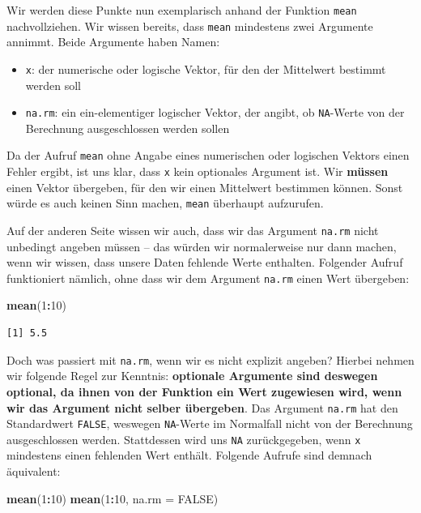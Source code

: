 \documentclass[12pt,]{tufte-book}
\newenvironment{Shaded}{\begin{snugshade}}{\end{snugshade}}
\newcommand{\KeywordTok}[1]{\textcolor[rgb]{0.13,0.29,0.53}{\textbf{#1}}}
\newcommand{\DataTypeTok}[1]{\textcolor[rgb]{0.13,0.29,0.53}{#1}}
\newcommand{\DecValTok}[1]{\textcolor[rgb]{0.00,0.00,0.81}{#1}}
\newcommand{\OtherTok}[1]{\textcolor[rgb]{0.56,0.35,0.01}{#1}}
\newcommand{\OperatorTok}[1]{\textcolor[rgb]{0.81,0.36,0.00}{\textbf{#1}}}
\newcommand{\NormalTok}[1]{#1}
\providecommand{\tightlist}{%
  \setlength{\itemsep}{0pt}\setlength{\parskip}{0pt}}
\theoremstyle{definition}
\theoremstyle{definition}
\theoremstyle{definition}
\theoremstyle{remark}
\begin{document}
Wir werden diese Punkte nun exemplarisch anhand der Funktion
\texttt{mean} nachvollziehen. Wir wissen bereits, dass \texttt{mean}
mindestens zwei Argumente annimmt. Beide Argumente haben Namen:

\begin{itemize}
\tightlist
\item
  \texttt{x}: der numerische oder logische Vektor, für den der
  Mittelwert bestimmt werden soll
\item
  \texttt{na.rm}: ein ein-elementiger logischer Vektor, der angibt, ob
  \texttt{NA}-Werte von der Berechnung ausgeschlossen werden sollen
\end{itemize}

Da der Aufruf \texttt{mean} ohne Angabe eines numerischen oder logischen
Vektors einen Fehler ergibt, ist uns klar, dass \texttt{x} kein
optionales Argument ist. Wir \textbf{müssen} einen Vektor übergeben, für
den wir einen Mittelwert bestimmen können. Sonst würde es auch keinen
Sinn machen, \texttt{mean} überhaupt aufzurufen.

Auf der anderen Seite wissen wir auch, dass wir das Argument
\texttt{na.rm} nicht unbedingt angeben müssen -- das würden wir
normalerweise nur dann machen, wenn wir wissen, dass unsere Daten
fehlende Werte enthalten. Folgender Aufruf funktioniert nämlich, ohne
dass wir dem Argument \texttt{na.rm} einen Wert übergeben:

\begin{Shaded}
\begin{Highlighting}[]
\KeywordTok{mean}\NormalTok{(}\DecValTok{1}\OperatorTok{:}\DecValTok{10}\NormalTok{)}
\end{Highlighting}
\end{Shaded}

\begin{verbatim}
[1] 5.5
\end{verbatim}

Doch was passiert mit \texttt{na.rm}, wenn wir es nicht explizit
angeben? Hierbei nehmen wir folgende Regel zur Kenntnis:
\textbf{optionale Argumente sind deswegen optional, da ihnen von der
Funktion ein Wert zugewiesen wird, wenn wir das Argument nicht selber
übergeben}. Das Argument \texttt{na.rm} hat den Standardwert
\texttt{FALSE}, weswegen \texttt{NA}-Werte im Normalfall nicht von der
Berechnung ausgeschlossen werden. Stattdessen wird uns \texttt{NA}
zurückgegeben, wenn \texttt{x} mindestens einen fehlenden Wert enthält.
Folgende Aufrufe sind demnach äquivalent:

\begin{Shaded}
\begin{Highlighting}[]

\KeywordTok{mean}\NormalTok{(}\DecValTok{1}\OperatorTok{:}\DecValTok{10}\NormalTok{)}
\KeywordTok{mean}\NormalTok{(}\DecValTok{1}\OperatorTok{:}\DecValTok{10}\NormalTok{, }\DataTypeTok{na.rm =} \OtherTok{FALSE}\NormalTok{)}
\end{Highlighting}
\end{Shaded}
\end{document}
